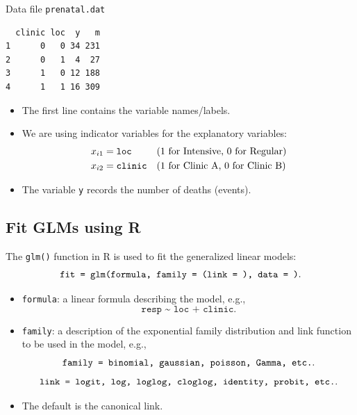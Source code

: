 \documentclass[oneside]{book}\usepackage[]{graphicx}\usepackage[svgnames]{xcolor}
\makeatletter
\newenvironment{kframe}{%
 \def\at@end@of@kframe{}%
 \ifinner\ifhmode%
  \def\at@end@of@kframe{\end{minipage}}%
  \begin{minipage}{\columnwidth}%
 \fi\fi%
 \def\FrameCommand##1{\hskip\@totalleftmargin \hskip-\fboxsep
 \colorbox{shadecolor}{##1}\hskip-\fboxsep
     \hskip-\linewidth \hskip-\@totalleftmargin \hskip\columnwidth}%
 \MakeFramed {\advance\hsize-\width
   \@totalleftmargin\z@ \linewidth\hsize
   \@setminipage}}%
 {\par\unskip\endMakeFramed%
 \at@end@of@kframe}
\newenvironment{knitrout}{}{} %
\makeatother
\begin{document}
\begin{Example}{Data file \texttt{prenatal.dat}}
\begin{knitrout}
\color{fgcolor}\begin{kframe}
\begin{verbatim}
  clinic loc  y   m
1      0   0 34 231
2      0   1  4  27
3      1   0 12 188
4      1   1 16 309
\end{verbatim}
\end{kframe}
\end{knitrout}
      \begin{itemize}
            \item The first line contains the variable names/labels.
            \item We are using indicator variables for the explanatory variables:
                  \begin{align*}
                        x_{i1} & =\text{\texttt{loc}}    &  & \text{(1 for Intensive, 0 for Regular)} \\
                        x_{i2} & =\text{\texttt{clinic}} &  & \text{(1 for Clinic A, 0 for Clinic B)}
                  \end{align*}
            \item The variable \texttt{y} records the number of deaths (events).
      \end{itemize}
\end{Example}
\subsection*{Fit GLMs using R}
The \texttt{glm()} function in R is used to fit the generalized linear models:
\[ \text{\texttt{fit = glm(formula, family = (link = ), data = )}}. \]
\begin{itemize}
      \item \texttt{formula}: a linear formula describing the model, e.g.,
            \[ \texttt{resp \textasciitilde{} loc + clinic}. \]
      \item \texttt{family}: a description of the exponential family distribution and link
            function to be used in the model, e.g.,
            \[ \text{\texttt{family = binomial, gaussian, poisson, Gamma, etc.}}. \]
            \[ \text{\texttt{link = logit, log, loglog, cloglog, identity, probit, etc.}}. \]
      \item The default is the canonical link.
\end{itemize}
\end{document}
